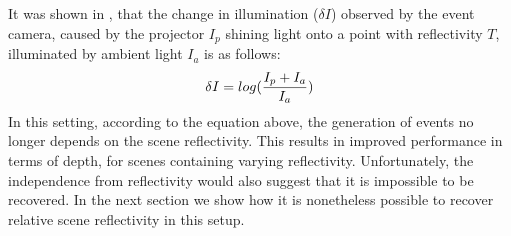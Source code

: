 It was shown in \cite{Matsuda18ICCP}, that the change in illumination ($\delta I$) observed by the event camera, caused by the projector $I_p$ shining light onto a point with reflectivity $T$, illuminated by ambient light $I_a$ is as follows:
\begin{equation}
    \delta I = log (\frac{I_p + I_a}{I_a})\\
\end{equation}
In this setting, according to the equation above, the generation of events no longer depends on the scene reflectivity.
This results in improved performance in terms of depth, for scenes containing varying reflectivity.
Unfortunately, the independence from reflectivity would also suggest that it is impossible to be recovered.
In the next section we show how it is nonetheless possible to recover relative scene reflectivity in this setup.

